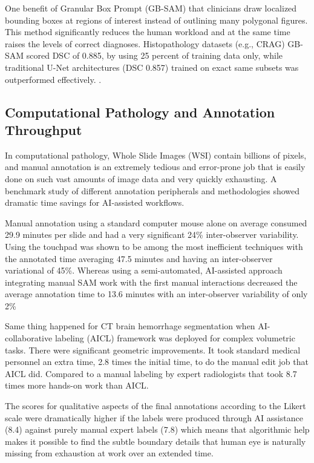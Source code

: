 \documentclass[10pt, conference, letterpaper]{IEEEtran}
\begin{document}
One benefit of Granular Box Prompt (GB-SAM) that clinicians draw localized bounding boxes at regions of interest instead of outlining many polygonal figures. This method significantly reduces the human workload and at the same time raises the levels of correct diagnoses. Histopathology datasets (e.g., CRAG) GB-SAM scored DSC of 0.885, by using 25 percent of training data only, while traditional U-Net architectures (DSC 0.857) trained on exact same subsets was outperformed effectively.
\cite{ref18}.

\subsection{Computational Pathology and Annotation Throughput}
In computational pathology, Whole Slide Images (WSI) contain billions of pixels, and manual annotation is an extremely tedious and error-prone job that is easily done on such vast amounts of image data and very quickly exhausting. A benchmark study of different annotation peripherals and methodologies showed dramatic time savings for AI-assisted workflows.\cite{ref15}

Manual annotation using a standard computer mouse alone on average consumed 29.9 minutes per slide and had a very significant 24\% inter-observer variability. \cite{ref1} Using the touchpad was shown to be among the most inefficient techniques with the annotated time averaging 47.5 minutes and having an inter-observer variational of 45\%. \cite{ref19} Whereas using a semi-automated, AI-assisted approach integrating manual SAM work with the first manual interactions decreased the average annotation time to 13.6 minutes with an inter-observer variability of only 2\%\cite{ref19}

Same thing happened for CT brain hemorrhage segmentation when AI-collaborative labeling (AICL) framework was deployed for complex volumetric tasks. There were significant geometric improvements. It took standard medical personnel an extra time, 2.8 times the initial time, to do the manual edit job that AICL did. Compared to a manual labeling by expert radiologists that took 8.7 times more hands-on work than AICL.

The scores for qualitative aspects of the final annotations according to the Likert scale were dramatically higher if the labels were produced through AI assistance (8.4) against purely manual expert labels (7.8) which means that algorithmic help makes it possible to find the subtle boundary details that human eye is naturally missing from exhaustion at work over an extended time.\cite{ref20}
\end{document}
